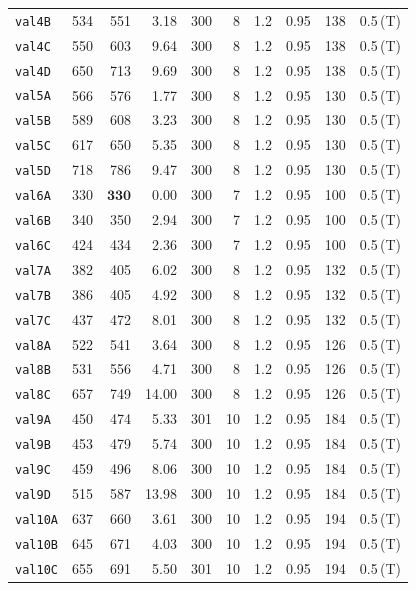 \begin{longtable}{lrrrrrrrrl}
\texttt{val4B} & 534 & 551 & 3.18 & 300 & 8 & 1.2 & 0.95 & 138 & 0.5\,(T) \\
\texttt{val4C} & 550 & 603 & 9.64 & 300 & 8 & 1.2 & 0.95 & 138 & 0.5\,(T) \\
\texttt{val4D} & 650 & 713 & 9.69 & 300 & 8 & 1.2 & 0.95 & 138 & 0.5\,(T) \\
\texttt{val5A} & 566 & 576 & 1.77 & 300 & 8 & 1.2 & 0.95 & 130 & 0.5\,(T) \\
\texttt{val5B} & 589 & 608 & 3.23 & 300 & 8 & 1.2 & 0.95 & 130 & 0.5\,(T) \\
\texttt{val5C} & 617 & 650 & 5.35 & 300 & 8 & 1.2 & 0.95 & 130 & 0.5\,(T) \\
\texttt{val5D} & 718 & 786 & 9.47 & 300 & 8 & 1.2 & 0.95 & 130 & 0.5\,(T) \\
\texttt{val6A} & 330 & $\mathbf{330}$ & 0.00 & 300 & 7 & 1.2 & 0.95 & 100 & 0.5\,(T) \\
\texttt{val6B} & 340 & 350 & 2.94 & 300 & 7 & 1.2 & 0.95 & 100 & 0.5\,(T) \\
\texttt{val6C} & 424 & 434 & 2.36 & 300 & 7 & 1.2 & 0.95 & 100 & 0.5\,(T) \\
\texttt{val7A} & 382 & 405 & 6.02 & 300 & 8 & 1.2 & 0.95 & 132 & 0.5\,(T) \\
\texttt{val7B} & 386 & 405 & 4.92 & 300 & 8 & 1.2 & 0.95 & 132 & 0.5\,(T) \\
\texttt{val7C} & 437 & 472 & 8.01 & 300 & 8 & 1.2 & 0.95 & 132 & 0.5\,(T) \\
\texttt{val8A} & 522 & 541 & 3.64 & 300 & 8 & 1.2 & 0.95 & 126 & 0.5\,(T) \\
\texttt{val8B} & 531 & 556 & 4.71 & 300 & 8 & 1.2 & 0.95 & 126 & 0.5\,(T) \\
\texttt{val8C} & 657 & 749 & 14.00 & 300 & 8 & 1.2 & 0.95 & 126 & 0.5\,(T) \\
\texttt{val9A} & 450 & 474 & 5.33 & 301 & 10 & 1.2 & 0.95 & 184 & 0.5\,(T) \\
\texttt{val9B} & 453 & 479 & 5.74 & 300 & 10 & 1.2 & 0.95 & 184 & 0.5\,(T) \\
\texttt{val9C} & 459 & 496 & 8.06 & 300 & 10 & 1.2 & 0.95 & 184 & 0.5\,(T) \\
\texttt{val9D} & 515 & 587 & 13.98 & 300 & 10 & 1.2 & 0.95 & 184 & 0.5\,(T) \\
\texttt{val10A} & 637 & 660 & 3.61 & 300 & 10 & 1.2 & 0.95 & 194 & 0.5\,(T) \\
\texttt{val10B} & 645 & 671 & 4.03 & 300 & 10 & 1.2 & 0.95 & 194 & 0.5\,(T) \\
\texttt{val10C} & 655 & 691 & 5.50 & 301 & 10 & 1.2 & 0.95 & 194 & 0.5\,(T) \\

\end{longtable}
